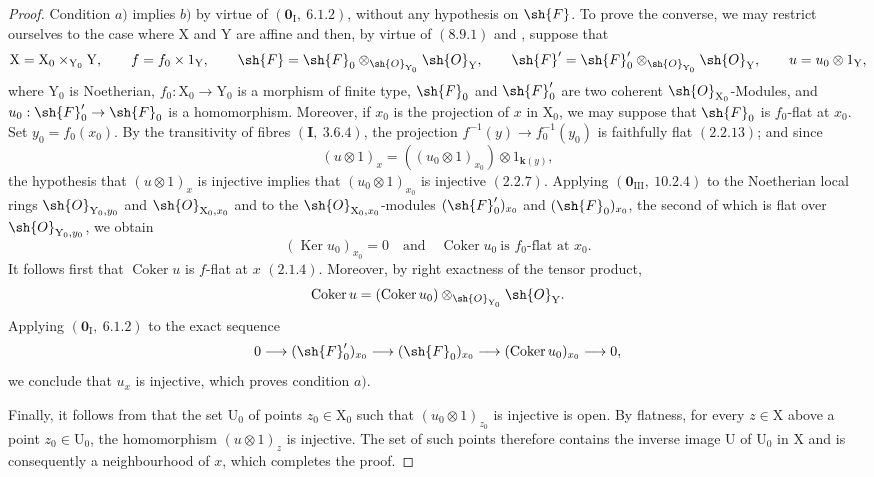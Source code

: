\begin{proof}
Condition $a)$ implies $b)$ by virtue of $(\mathbf{0}_\mathrm{I},~6.1.2)$, without any hypothesis on $\sh{F}$. To prove the converse, we may restrict ourselves to the case where $\mathrm{X}$ and $\mathrm{Y}$ are affine and then, by virtue of $(8.9.1)$ and , suppose that
\[
  \mathrm{X}=\mathrm{X}_0\times_{\mathrm{Y}_0}\mathrm{Y},\qquad
  f=f_0\times 1_\mathrm{Y},\qquad
  \sh{F}=\sh{F}_0\otimes_{\sh{O}_{\mathrm{Y}_0}}\sh{O}_\mathrm{Y},\qquad
  \sh{F}'=\sh{F}'_0\otimes_{\sh{O}_{\mathrm{Y}_0}}\sh{O}_\mathrm{Y},\qquad
  u=u_0\otimes 1_\mathrm{Y},
\]
where $\mathrm{Y}_0$ is Noetherian, $f_0:\mathrm{X}_0\to\mathrm{Y}_0$ is a morphism of finite type, $\sh{F}_0$ and $\sh{F}'_0$ are two coherent $\sh{O}_{\mathrm{X}_0}$-Modules, and $u_0:\sh{F}'_0\to\sh{F}_0$ is a homomorphism. Moreover, if $x_0$ is the projection of $x$ in $\mathrm{X}_0$, we may suppose that $\sh{F}_0$ is $f_0$-flat at $x_0$. Set $y_0=f_0(x_0)$. By the transitivity of fibres $(\mathbf{I},~3.6.4)$, the projection $f^{-1}(y)\to f_0^{-1}(y_0)$ is faithfully flat $(2.2.13)$; and since
\[
  (u\otimes 1)_x=((u_0\otimes 1)_{x_0})\otimes 1_{\boldsymbol{k}(y)},
\]
the hypothesis that $(u\otimes 1)_x$ is injective implies that $(u_0\otimes 1)_{x_0}$ is injective $(2.2.7)$. Applying $(\mathbf{0}_{\mathrm{III}},~10.2.4)$ to the Noetherian local rings $\sh{O}_{\mathrm{Y}_0,y_0}$ and $\sh{O}_{\mathrm{X}_0,x_0}$ and to the $\sh{O}_{\mathrm{X}_0,x_0}$-modules $(\sh{F}'_0)_{x_0}$ and $(\sh{F}_0)_{x_0}$, the second of which is flat over $\sh{O}_{\mathrm{Y}_0,y_0}$, we obtain
\[
  (\operatorname{Ker}u_0)_{x_0}=0
  \quad\text{and}\quad
  \operatorname{Coker}u_0\ \text{is $f_0$-flat at }x_0.
\]
It follows first that $\operatorname{Coker}u$ is $f$-flat at $x$ $(2.1.4)$. Moreover, by right exactness of the tensor product,
\[
  \operatorname{Coker}u=(\operatorname{Coker}u_0)
  \otimes_{\sh{O}_{\mathrm{Y}_0}}\sh{O}_\mathrm{Y}.
\]
Applying $(\mathbf{0}_\mathrm{I},~6.1.2)$ to the exact sequence
\[
  0\longrightarrow(\sh{F}'_0)_{x_0}
  \longrightarrow(\sh{F}_0)_{x_0}
  \longrightarrow(\operatorname{Coker}u_0)_{x_0}
  \longrightarrow0,
\]
we conclude that $u_x$ is injective, which proves condition $a)$.

Finally, it follows from  that the set $\mathrm{U}_0$ of points $z_0\in\mathrm{X}_0$ such that $(u_0\otimes 1)_{z_0}$ is injective is open. By flatness, for every $z\in\mathrm{X}$ above a point $z_0\in\mathrm{U}_0$, the homomorphism $(u\otimes 1)_z$ is injective. The set of such points therefore contains the inverse image $\mathrm{U}$ of $\mathrm{U}_0$ in $\mathrm{X}$ and is consequently a neighbourhood of $x$, which completes the proof.
\end{proof}

